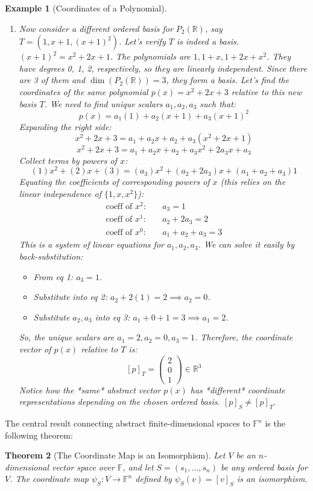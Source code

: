 \documentclass[11pt, letterpaper]{article}
\theoremstyle{mytheoremstyle}
\newtheorem{theorem}{Theorem}[section]
\theoremstyle{mydefinitionstyle}
\newtheorem{example}[theorem]{Example}
\theoremstyle{myremarkstyle}
\newcommand{\F}{\mathbb{F}}
\newcommand{\R}{\mathbb{R}}
\newcommand{\mat}[1]{\begin{pmatrix}#1\end{pmatrix}} %
\newcommand{\coord}[2]{[#1]_{#2}} %
\begin{document}
\begin{example}[Coordinates of a Polynomial]
\begin{enumerate}
    \item Now consider a \emph{different ordered basis} for $P_2(\R)$, say $T = (1, x+1, (x+1)^2)$.
    Let's verify $T$ is indeed a basis. $(x+1)^2 = x^2+2x+1$. The polynomials are $1, 1+x, 1+2x+x^2$. They have degrees 0, 1, 2, respectively, so they are linearly independent. Since there are 3 of them and $\dim(P_2(\R))=3$, they form a basis.
    Let's find the coordinates of the \emph{same} polynomial $p(x) = x^2 + 2x + 3$ relative to this new basis $T$. We need to find unique scalars $a_1, a_2, a_3$ such that:
    \[ p(x) = a_1 (1) + a_2 (x+1) + a_3 (x+1)^2 \]
    Expanding the right side:
    \[ x^2 + 2x + 3 = a_1 + a_2 x + a_2 + a_3 (x^2 + 2x + 1) \]
    \[ x^2 + 2x + 3 = a_1 + a_2 x + a_2 + a_3 x^2 + 2a_3 x + a_3 \]
    Collect terms by powers of $x$:
    \[ (1)x^2 + (2)x + (3) = (a_3)x^2 + (a_2 + 2a_3)x + (a_1 + a_2 + a_3)1 \]
    Equating the coefficients of corresponding powers of $x$ (this relies on the linear independence of $\{1, x, x^2\}$):
    \begin{align*} \text{coeff of } x^2: \quad & a_3 = 1 \\ \text{coeff of } x^1: \quad & a_2 + 2a_3 = 2 \\ \text{coeff of } x^0: \quad & a_1 + a_2 + a_3 = 3 \end{align*}
    This is a system of linear equations for $a_1, a_2, a_3$. We can solve it easily by back-substitution:
    \begin{itemize}
        \item From eq 1: $a_3 = 1$.
        \item Substitute into eq 2: $a_2 + 2(1) = 2 \implies a_2 = 0$.
        \item Substitute $a_2, a_3$ into eq 3: $a_1 + 0 + 1 = 3 \implies a_1 = 2$.
    \end{itemize}
    So, the unique scalars are $a_1=2, a_2=0, a_3=1$.
    Therefore, the coordinate vector of $p(x)$ relative to $T$ is:
    \[ \coord{p}{T} = \mat{2 \\ 0 \\ 1} \in \R^3 \]
    Notice how the *same* abstract vector $p(x)$ has *different* coordinate representations depending on the chosen ordered basis. $\coord{p}{S} \neq \coord{p}{T}$.
\end{enumerate}
\end{example}

The central result connecting abstract finite-dimensional spaces to $\F^n$ is the following theorem:

\begin{theorem}[The Coordinate Map is an Isomorphism]
Let $V$ be an $n$-dimensional vector space over $\F$, and let $S = (s_1, \dots, s_n)$ be any ordered basis for $V$. The coordinate map $\psi_S: V \to \F^n$ defined by $\psi_S(v) = \coord{v}{S}$ is an isomorphism.
\end{theorem}
\end{document}
